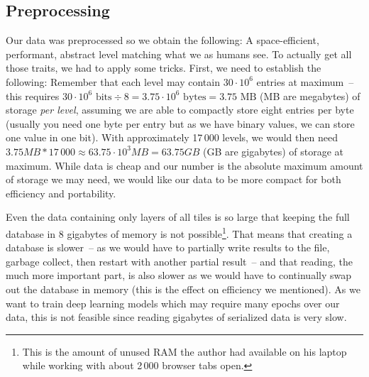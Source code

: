 \subsection{Preprocessing}
\label{sec:preprocessing}

Our data was preprocessed so we obtain the following: A
space-efficient, performant, abstract level matching what we as humans
see. To actually get all those traits, we had to apply some tricks.
First, we need to establish the following: Remember that each level
may contain $30 \cdot 10^{6}$ entries at maximum~-- this requires
$30 \cdot 10^{6}\text{ bits} \div 8 = 3.75 \cdot 10^{6}\text{ bytes} =
3.75\text{ MB}$ (MB are megabytes) of storage \emph{per level},
assuming we are able to compactly store eight entries per byte
(usually you need one byte per entry but as we have binary values, we
can store one value in one bit). With approximately 17\,000 levels, we
would then need
$3.75 MB * 17\,000 \approx 63.75 \cdot 10^{3} MB = 63.75 GB$ (GB are
gigabytes) of storage at maximum. While data is cheap and our number
is the absolute maximum amount of storage we may need, we would like
our data to be more compact for both efficiency and portability.

Even the data containing only layers of all tiles is so large that
keeping the full database in 8 gigabytes of memory is not
possible\footnote{This is the amount of unused RAM the author had
  available on his laptop while working with about 2\,000 browser tabs
  open.}. That means that creating a database is slower~-- as we would
have to partially write results to the file, garbage collect, then
restart with another partial result~-- and that reading, the much more
important part, is also slower as we would have to continually swap
out the database in memory (this is the effect on efficiency we
mentioned). As we want to train deep learning models which may require
many epochs over our data, this is not feasible since reading
gigabytes of serialized data is very slow.

